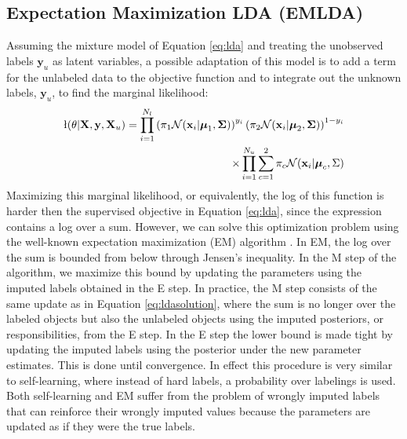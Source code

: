 \subsection{Expectation Maximization LDA (EMLDA)}
Assuming the mixture model of Equation \eqref{eq:lda} and treating the unobserved labels $\mathbf{y}_u$ as latent variables, a possible adaptation of this model is to add a term for the unlabeled data to the objective function and to integrate out the unknown labels, $\mathbf{y}_u$, to find the marginal likelihood:
\begin{align}
\l(\theta|\mathbf{X},\mathbf{y},\mathbf{X}_u)=\prod_{i=1}^{N_l}\left(\pi_1 \mathcal{N}(\mathbf{x}_i|\boldsymbol{\mu}_1,\mathbf{\Sigma})\right)^{y_i} \left(\pi_2 \mathcal{N}(\mathbf{x}_i|\boldsymbol{\mu}_2,\mathbf{\Sigma})\right)^{1-y_i}  \nonumber \\ 
\times \prod_{i=1}^{N_u} \sum_{c=1}^2 \pi_c \mathcal{N}(\mathbf{x}_i|\boldsymbol{\mu}_c,\Sigma)
\end{align}
Maximizing this marginal likelihood, or equivalently, the log of this function is harder then the supervised objective in Equation \eqref{eq:lda}, since the expression contains a log over a sum. However, we can solve this optimization problem using the well-known expectation maximization (EM) algorithm \cite{Dempster1977, Nigam2000}. In EM, the log over the sum is bounded from below through Jensen's inequality. In the M step of the algorithm, we maximize this bound by updating the parameters using the imputed labels obtained in the E step. In practice, the M step consists of the same update as in Equation \eqref{eq:ldasolution}, where the sum is no longer over the labeled objects but also the unlabeled objects using the imputed posteriors, or responsibilities, from the E step. In the E step the lower bound is made tight by updating the imputed labels using the posterior under the new parameter estimates. This is done until convergence. 
In effect this procedure is very similar to self-learning, where instead of hard labels, a probability over labelings is used. Both self-learning and EM suffer from the problem of wrongly imputed labels that can reinforce their wrongly imputed values because the parameters are updated as if they were the true labels.

